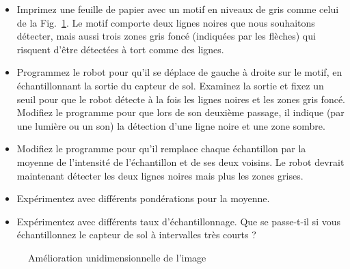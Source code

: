 \begin{framed}
\begin{itemize}
\item Imprimez une feuille de papier avec un motif en niveaux de gris comme celui de la Fig.~\ref{fig.one-enhance}. Le motif comporte deux lignes noires que nous souhaitons détecter, mais aussi trois zones gris foncé (indiquées par les flèches) qui risquent d'être détectées à tort comme des lignes.
\item Programmez le robot pour qu'il se déplace de gauche à droite sur le motif, en échantillonnant la sortie du capteur de sol. Examinez la sortie et fixez un seuil pour que le robot détecte à la fois les lignes noires et les zones gris foncé. Modifiez le programme pour que lors de son deuxième passage, il indique (par une lumière ou un son) la détection d'une ligne noire et une zone sombre.
\item Modifiez le programme pour qu'il remplace chaque échantillon par la moyenne de l'intensité de l'échantillon et de ses deux voisins. Le robot devrait maintenant détecter les deux lignes noires mais plus les zones grises.
\item Expérimentez avec différents pondérations pour la moyenne.
\item Expérimentez avec différents taux d'échantillonnage. Que se passe-t-il si vous échantillonnez le capteur de sol à intervalles très courts ?
\end{itemize}
\end{framed}

\begin{figure}
\begin{center}
\caption{Amélioration unidimensionnelle de l'image}\label{fig.one-enhance}
\end{center}
\end{figure}

